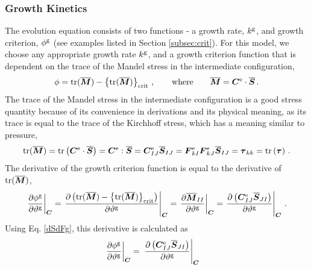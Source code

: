 \documentclass[10pt,letterpaper,oneside]{report}
\newcommand{\ten}[1]{\mbox{\boldmath $#1$}{}}
\newcommand{\scas}[1]{\mbox{{\scriptsize{${\rm{#1}}$}}}{}}
\newcommand{\tens}[1]{\mbox{\boldmath{\scriptsize{$#1$}}}{}}
\begin{document}
\begin{itemize}
\subsubsection{Growth Kinetics}
The evolution equation consists of two functions - a growth rate, $k^{\scas{g}}$, and growth criterion, $\phi^{\scas{g}}$ (see examples listed in Section \ref{subsec:crit}).  For this model, we choose any appropriate growth rate $k^{\scas{g}}$, and a growth criterion function that is dependent on the trace of the Mandel stress in the intermediate configuration, 
\begin{equation}
\phi = \mbox{tr} ( \overline{\ten{M}} ) - \left\lbrace \mbox{tr} ( \overline{\ten{M}} ) \right\rbrace_{\scas{crit}} \, , 
\qquad \mbox{where} \qquad
\overline{\ten{M}} = \ten{C}^{\scas{e}} \cdot \overline{\ten{S}} \, . 
\end{equation}
The trace of the Mandel stress in the intermediate configuration is a good stress quantity because of its convenience in derivations and its physical meaning, as its trace is equal to the trace of the Kirchhoff stress, which has a meaning similar to pressure, 
\begin{equation}
\mbox{tr} (\overline{\ten{M}} ) = \mbox{tr} \left( \ten{C}^{\scas{e}} \cdot \overline{\ten{S}} \right) =  \ten{C}^{\scas{e}} : \overline{\ten{S}} =  \ten{C}^{\scas{e}}_{IJ} \overline{\ten{S}}_{IJ} = \ten{F}^{\scas{e}}_{kI} \ten{F}^{\scas{e}}_{kJ} \overline{\ten{S}}_{IJ} = \ten{\tau}_{kk} = \mbox{tr} \left( \ten{\tau} \right) \, . 
\end{equation}
The derivative of the growth criterion function is equal to the derivative of $ \mbox{tr} ( \overline{ \ten{M}} ) $, 
\begin{equation}
\left. \frac{\partial \phi^{\scas{g}}}{\partial \vartheta^{\scas{g}}} \right|_{\tens{C}}
= \left. \frac{\partial \left( \mbox{tr} (\overline{\ten{M}}) - \left\lbrace \mbox{tr} (\overline{\ten{M}} )\right\rbrace_{\scas{crit}} \right)}{\partial \vartheta^{\scas{g}}} \right|_{\tens{C}}
= \left. \frac{\partial \overline{\ten{M}}_{II} }{\partial \vartheta^{\scas{g}}} \right|_{\tens{C}} 
= \left. \frac{ \partial \left( \ten{C}^{\scas{e}}_{IJ} \overline{\ten{S}}_{JI} \right)}{\partial \vartheta^{\scas{g}}} \right|_{\tens{C}} \, . 
\end{equation}
Using Eq. \ref{dSdFg}, this derivative is calculated as 
\begin{align}
\left. \frac{\partial \phi^{\scas{g}}}{\partial \vartheta^{\scas{g}}} \right|_{\tens{C}}
={}& \left. \frac{ \partial \left( \ten{C}^{\scas{e}}_{IJ} \overline{\ten{S}}_{JI} \right)}{\partial \vartheta^{\scas{g}}} \right|_{\tens{C}}

\end{align}
\end{itemize}
\end{document}
